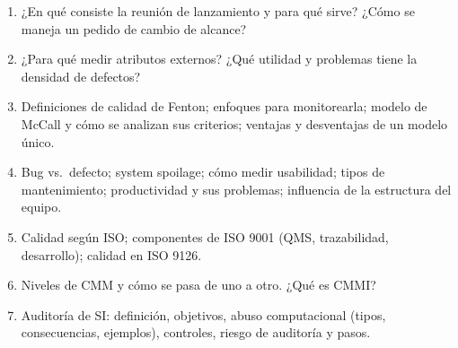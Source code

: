 \documentclass[11pt,a4paper]{article}
\begin{document}
\begin{enumerate}
  \item ¿En qué consiste la reunión de lanzamiento y para qué sirve? ¿Cómo se maneja un pedido de cambio de alcance?
  \item ¿Para qué medir atributos externos? ¿Qué utilidad y problemas tiene la densidad de defectos?
  \item Definiciones de calidad de Fenton; enfoques para monitorearla; modelo de McCall y cómo se analizan sus
  criterios; ventajas y desventajas de un modelo único.
  \item Bug vs.\ defecto; system spoilage; cómo medir usabilidad; tipos de mantenimiento; productividad y sus
  problemas; influencia de la estructura del equipo.
  \item Calidad según ISO; componentes de ISO 9001 (QMS, trazabilidad, desarrollo); calidad en ISO 9126.
  \item Niveles de CMM y cómo se pasa de uno a otro. ¿Qué es CMMI?
  \item Auditoría de SI: definición, objetivos, abuso computacional (tipos, consecuencias, ejemplos), controles,
  riesgo de auditoría y pasos.
\end{enumerate}
\end{document}
